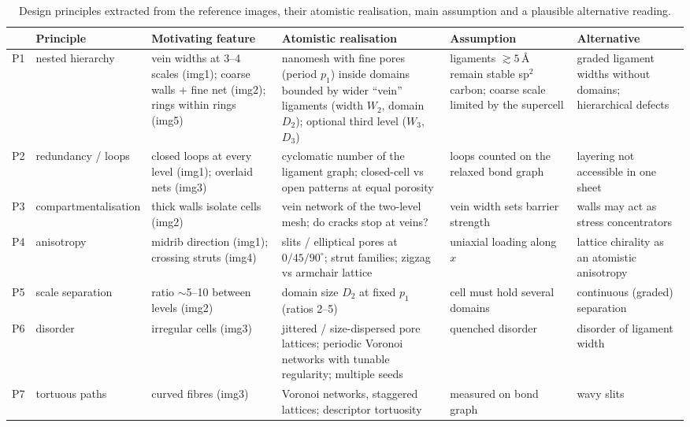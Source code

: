 \begin{table}[H]\centering\footnotesize
\caption{Design principles extracted from the reference images, their atomistic realisation, main assumption and a plausible alternative reading.}
\label{tab:principles}
\setlength{\tabcolsep}{4pt}
\begin{tabular}{p{0.45cm}>{\raggedright\arraybackslash}p{2.1cm}>{\raggedright\arraybackslash}p{2.2cm}>{\raggedright\arraybackslash}p{4.6cm}>{\raggedright\arraybackslash}p{2.4cm}>{\raggedright\arraybackslash}p{2.4cm}}
\toprule
 & Principle & Motivating feature & Atomistic realisation & Assumption & Alternative\\
\midrule
P1 & nested hierarchy & vein widths at 3--4 scales (img1); coarse walls + fine net (img2); rings within rings (img5) & nanomesh with fine pores (period $p_1$) inside domains bounded by wider ``vein'' ligaments (width $W_2$, domain $D_2$); optional third level ($W_3$, $D_3$) & ligaments $\gtrsim 5$\,\AA{} remain stable sp$^2$ carbon; coarse scale limited by the supercell & graded ligament widths without domains; hierarchical defects\\
P2 & redundancy / loops & closed loops at every level (img1); overlaid nets (img3) & cyclomatic number of the ligament graph; closed-cell vs open patterns at equal porosity & loops counted on the relaxed bond graph & layering not accessible in one sheet\\
P3 & compart\-mentalisation & thick walls isolate cells (img2) & vein network of the two-level mesh; do cracks stop at veins? & vein width sets barrier strength & walls may act as stress concentrators\\
P4 & anisotropy & midrib direction (img1); crossing struts (img4) & slits / elliptical pores at $0/45/90^\circ$; strut families; zigzag vs armchair lattice & uniaxial loading along $x$ & lattice chirality as an atomistic anisotropy\\
P5 & scale separation & ratio $\sim$5--10 between levels (img2) & domain size $D_2$ at fixed $p_1$ (ratios 2--5) & cell must hold several domains & continuous (graded) separation\\
P6 & disorder & irregular cells (img3) & jittered / size-dispersed pore lattices; periodic Voronoi networks with tunable regularity; multiple seeds & quenched disorder & disorder of ligament width\\
P7 & tortuous paths & curved fibres (img3) & Voronoi networks, staggered lattices; descriptor tortuosity & measured on bond graph & wavy slits\\

\end{tabular}
\end{table}
